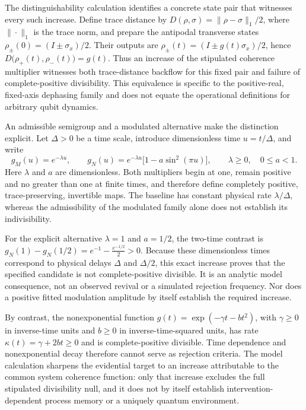 \documentclass[11pt]{article}
\begin{document}
The distinguishability calculation identifies a concrete state pair that witnesses every such increase. Define trace distance by $D(\rho,\sigma)=\|\rho-\sigma\|_1/2$, where $\|\cdot\|_1$ is the trace norm, and prepare the antipodal transverse states $\rho_\pm(0)=(I\pm\sigma_x)/2$. Their outputs are $\rho_\pm(t)=(I\pm g(t)\sigma_x)/2$, hence
$D\bigl(\rho_+(t),\rho_-(t)\bigr)=g(t).$
Thus an increase of the stipulated coherence multiplier witnesses both trace-distance backflow for this fixed pair and failure of complete-positive divisibility. This equivalence is specific to the positive-real, fixed-axis dephasing family and does not equate the operational definitions for arbitrary qubit dynamics.

An admissible semigroup and a modulated alternative make the distinction explicit. Let $\Delta>0$ be a time scale, introduce dimensionless time $u=t/\Delta$, and write
\[g_M(u)=e^{-\lambda u},\qquad g_N(u)=e^{-\lambda u}\bigl[1-a\sin^2(\pi u)\bigr],\qquad \lambda\geq0,\quad 0\leq a<1.\]
Here $\lambda$ and $a$ are dimensionless. Both multipliers begin at one, remain positive and no greater than one at finite times, and therefore define completely positive, trace-preserving, invertible maps. The baseline has constant physical rate $\lambda/\Delta$, whereas the admissibility of the modulated family alone does not establish its indivisibility.

For the explicit alternative $\lambda=1$ and $a=1/2$, the two-time contrast is
$g_N(1)-g_N(1/2)=e^{-1}-\frac{e^{-1/2}}{2}>0.$
Because these dimensionless times correspond to physical delays $\Delta$ and $\Delta/2$, this exact increase proves that the specified candidate is not complete-positive divisible. It is an analytic model consequence, not an observed revival or a simulated rejection frequency. Nor does a positive fitted modulation amplitude by itself establish the required increase.

By contrast, the nonexponential function $g(t)=\exp(-\gamma t-bt^2)$, with $\gamma\geq0$ in inverse-time units and $b\geq0$ in inverse-time-squared units, has rate $\kappa(t)=\gamma+2bt\geq0$ and is complete-positive divisible. Time dependence and nonexponential decay therefore cannot serve as rejection criteria. The model calculation sharpens the evidential target to an increase attributable to the common system coherence function: only that increase excludes the full stipulated divisibility null, and it does not by itself establish intervention-dependent process memory or a uniquely quantum environment.
\end{document}
